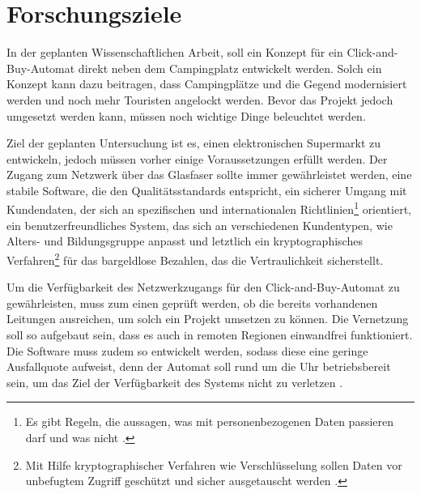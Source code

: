 \section{Forschungsziele}


In der geplanten Wissenschaftlichen Arbeit, soll ein Konzept für ein Click-and-Buy-Automat direkt neben
dem Campingplatz entwickelt werden. Solch ein Konzept kann dazu beitragen, dass Campingplätze und die Gegend
modernisiert werden und noch mehr Touristen angelockt werden. Bevor das Projekt jedoch umgesetzt werden kann, 
müssen noch wichtige Dinge beleuchtet werden. 


Ziel der geplanten Untersuchung ist es, einen elektronischen Supermarkt zu entwickeln, jedoch müssen vorher 
einige Voraussetzungen erfüllt werden. Der Zugang zum Netzwerk über das Glasfaser sollte immer gewährleistet
werden, eine stabile Software, die den Qualitätsstandards entspricht, ein sicherer Umgang mit Kundendaten, 
der sich an spezifischen und internationalen Richtlinien\footnote{Es gibt Regeln, die aussagen, 
was mit personenbezogenen Daten passieren darf und was nicht \cite{refart:DSDS}.} orientiert, ein benutzerfreundliches
System, das sich an verschiedenen Kundentypen, wie Alters- und Bildungsgruppe anpasst und letztlich ein 
kryptographisches Verfahren\footnote{Mit Hilfe kryptographischer Verfahren wie Verschlüsselung sollen
Daten vor unbefugtem Zugriff geschützt und sicher ausgetauscht werden \cite{refart:SLWK}.} für das bargeldlose 
Bezahlen, das die Vertraulichkeit sicherstellt.


Um die Verfügbarkeit des Netzwerkzugangs für den Click-and-Buy-Automat zu gewährleisten, muss zum einen 
geprüft werden, ob die bereits vorhandenen Leitungen ausreichen, um solch ein Projekt umsetzen zu können.
Die Vernetzung soll so aufgebaut sein, dass es auch in remoten Regionen einwandfrei funktioniert. 
Die Software muss zudem so entwickelt werden, sodass diese eine geringe Ausfallquote aufweist, 
denn der Automat soll rund um die Uhr betriebsbereit sein, um das Ziel der Verfügbarkeit des
Systems nicht zu verletzen \cite{refbook:SWIS}.


